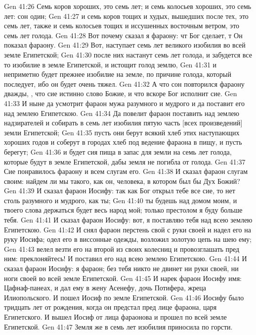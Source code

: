 \vs Gen 41:26 Семь коров хороших, это семь лет; и семь колосьев хороших, это семь лет: сон один;
\vs Gen 41:27 и семь коров тощих и худых, вышедших после тех, это семь лет, также и семь колосьев тощих и иссушенных восточным ветром, это семь лет голода.
\vs Gen 41:28 Вот почему сказал я фараону: чт Бог сделает, т Он показал фараону.
\vs Gen 41:29 Вот, наступает семь лет великого изобилия во всей земле Египетской;
\vs Gen 41:30 после них настанут семь лет голода, и забудется все то изобилие в земле Египетской, и истощит голод землю,
\vs Gen 41:31 и неприметно будет прежнее изобилие на земле, по причине голода, который последует, ибо он будет очень тяжел.
\vs Gen 41:32 А что сон повторился фараону дважды, , что сие истинно слово Божие, и что вскоре Бог исполнит сие.
\vs Gen 41:33 И ныне да усмотрит фараон мужа разумного и мудрого и да поставит его над землею Египетскою.
\vs Gen 41:34 Да повелит фараон поставить над землею надзирателей и собирать в семь лет изобилия пятую часть [всех произведений] земли Египетской;
\vs Gen 41:35 пусть они берут всякий хлеб этих наступающих хороших годов и соберут в городах хлеб под ведение фараона в пищу, и пусть берегут;
\vs Gen 41:36 и будет сия пища в запас для земли на семь лет голода, которые будут в земле Египетской, дабы земля не погибла от голода.
\rsbpar\vs Gen 41:37 Сие понравилось фараону и всем слугам его.
\vs Gen 41:38 И сказал фараон слугам своим: найдем ли мы такого, как он, человека, в котором был бы Дух Божий?
\vs Gen 41:39 И сказал фараон Иосифу: так как Бог открыл тебе все сие, то нет столь разумного и мудрого, как ты;
\vs Gen 41:40 ты будешь над домом моим, и твоего слова держаться будет весь народ мой; только престолом я буду больше тебя.
\vs Gen 41:41 И сказал фараон Иосифу: вот, я поставляю тебя над всею землею Египетскою.
\vs Gen 41:42 И снял фараон перстень свой с руки своей и надел его на руку Иосифа; одел его в виссонные одежды, возложил золотую цепь на шею ему;
\vs Gen 41:43 велел везти его на второй из своих колесниц и провозглашать пред ним: преклоняйтесь! И поставил его над всею землею Египетскою.
\vs Gen 41:44 И сказал фараон Иосифу: я фараон; без тебя никто не двинет ни руки своей, ни ноги своей во всей земле Египетской.
\vs Gen 41:45 И нарек фараон Иосифу имя: Цафнаф-панеах, и дал ему в жену Асенефу, дочь Потифера, жреца Илиопольского. И пошел Иосиф по земле Египетской.
\vs Gen 41:46 Иосифу было тридцать лет от рождения, когда он предстал пред лице фараона, царя Египетского. И вышел Иосиф от лица фараонова и прошел по всей земле Египетской.
\vs Gen 41:47 Земля же в семь лет изобилия приносила  по горсти.
